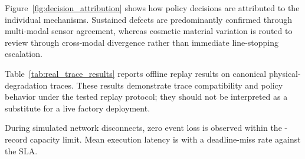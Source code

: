 \documentclass[conference]{IEEEtran}
\begin{document}
Figure~\ref{fig:decision_attribution} shows how policy decisions are attributed to the individual mechanisms. Sustained defects are predominantly confirmed through multi-modal sensor agreement, whereas cosmetic material variation is routed to review through cross-modal divergence rather than immediate line-stopping escalation.

\begin{table}[!b]
    \centering
    \caption{Validation on run-to-failure traces from NASA IMS bearing and C-MAPSS turbofan datasets.}
    \label{tab:real_trace_results}
\end{table}

Table~\ref{tab:real_trace_results} reports offline replay results on canonical physical-degradation traces. These results demonstrate trace compatibility and policy behavior under the tested replay protocol; they should not be interpreted as a substitute for a live factory deployment.

During simulated network disconnects, zero event loss is observed within the \SpoolBufferCapacity{}-record capacity limit. Mean execution latency is \MeanPipelineLatency{} with a \DeadlineMissRate{} deadline-miss rate against the \TargetDeadlineMs{} SLA.

\balance
\end{document}
